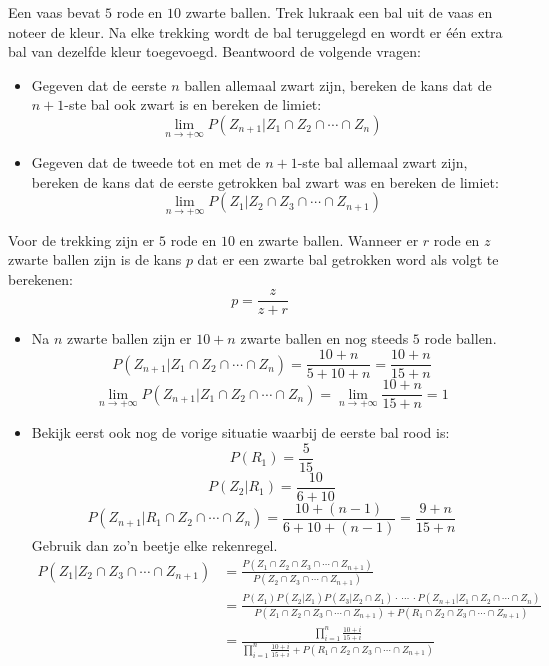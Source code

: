 \documentclass[main.tex]{subfiles}
\begin{document}
\begin{oef}
  Een vaas bevat $5$ rode en $10$ zwarte ballen.
  Trek lukraak een bal uit de vaas en noteer de kleur.
  Na elke trekking wordt de bal teruggelegd en wordt er \'e\'en extra bal van dezelfde kleur toegevoegd.
  Beantwoord de volgende vragen:
  \begin{itemize}
  \item Gegeven dat de eerste $n$ ballen allemaal zwart zijn, bereken de kans dat de $n+1$-ste bal ook zwart is en bereken de limiet:
    \[ \lim_{n \rightarrow +\infty}P(Z_{n+1}|Z_{1} \cap Z_{2} \cap \dotsb \cap Z_{n}) \]
  \item Gegeven dat de tweede tot en met de $n+1$-ste bal allemaal zwart zijn, bereken de kans dat de eerste getrokken bal zwart was en bereken de limiet:
    \[ \lim_{n \rightarrow +\infty}P(Z_{1}| Z_{2} \cap Z_{3} \cap \dotsb \cap Z_{n+1}) \]
  \end{itemize}
  Voor de trekking zijn er $5$ rode en $10$ en zwarte ballen.
  Wanneer er $r$ rode en $z$ zwarte ballen zijn is de kans $p$ dat er een zwarte bal getrokken word als volgt te berekenen:
  \[ p = \frac{z}{z+r} \]
  \begin{itemize}
  \item  Na $n$ zwarte ballen zijn er $10+n$ zwarte ballen en nog steeds $5$ rode ballen.
    \[ P(Z_{n+1}|Z_{1} \cap Z_{2} \cap \dotsb \cap Z_{n}) = \frac{10+n}{5+10+n} = \frac{10+n}{15+n} \]
    \[ \lim_{n \rightarrow +\infty}P(Z_{n+1}|Z_{1} \cap Z_{2} \cap \dotsb \cap Z_{n}) = \lim_{n \rightarrow +\infty}\frac{10+n}{15+n} = 1 \]
  \item
    Bekijk eerst ook nog de vorige situatie waarbij de eerste bal rood is:
    \[ P(R_{1}) = \frac{5}{15}\]
    \[ P(Z_{2} | R_{1}) = \frac{10}{6+10} \]
    \[ P(Z_{n+1}|R_{1} \cap Z_{2} \cap \dotsb \cap Z_{n}) = \frac{10+(n-1)}{6+10+(n-1)} = \frac{9+n}{15+n} \]
    Gebruik dan zo'n beetje elke rekenregel.
    \[
    \begin{array}{rl}
      P(Z_{1}| Z_{2} \cap Z_{3} \cap \dotsb \cap Z_{n+1})
      &= \frac{P(Z_{1}\cap Z_{2} \cap Z_{3} \cap \dotsb \cap Z_{n+1})}{P(Z_{2} \cap Z_{3} \cap \dotsb \cap Z_{n+1})}\\
      &= \frac{P(Z_{1})P(Z_{2}|Z_{1})P(Z_{3}|Z_{2}\cap Z_{1}) \cdot\ \dotsb\ \cdot P(Z_{n+1}|Z_{1} \cap Z_{2} \cap \dotsb \cap Z_{n}) }{P(Z_{1} \cap Z_{2} \cap Z_{3} \cap \dotsb \cap Z_{n+1})+P(R_{1} \cap Z_{2} \cap Z_{3} \cap \dotsb \cap Z_{n+1})}\\
      &= \frac{\prod_{i=1}^{n}\frac{10+i}{15+i} }{\prod_{i=1}^{n}\frac{10+i}{15+i}+P(R_{1} \cap Z_{2} \cap Z_{3} \cap \dotsb \cap Z_{n+1})}\\

\end{array}\]
\end{itemize}
\end{oef}
\end{document}
